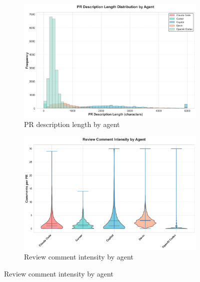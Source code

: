 \documentclass[11pt]{article}
\begin{document}
\begin{figure}[H]
\begin{subfigure}[b]{0.48\textwidth}
\centering
\includegraphics[width=\textwidth]{figures_individual/33_entity_pr_description_length_by_agent.png}
\caption{PR description length by agent}
\label{fig:entity_pr_desc}
\end{subfigure}
\hfill
\begin{subfigure}[b]{0.48\textwidth}
\centering
\includegraphics[width=\textwidth]{figures_individual/34_entity_review_comment_intensity_by_agent.png}
\caption{Review comment intensity by agent}
\label{fig:entity_comments}
\end{subfigure}

\vspace{0.2cm}


\end{figure}
\end{document}
